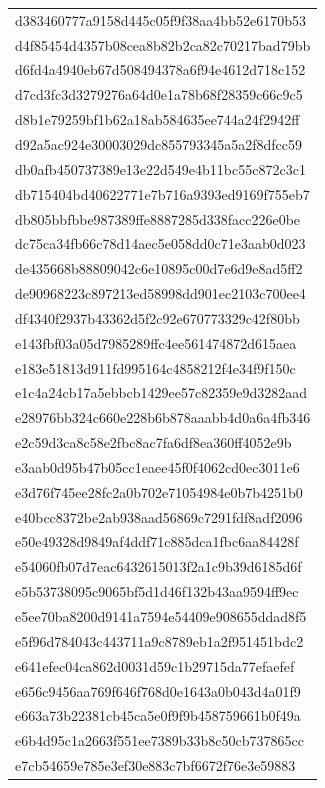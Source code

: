 \begin{tabular}{l}
d383460777a9158d445c05f9f38aa4bb52e6170b53 \\
d4f85454d4357b08cea8b82b2ca82c70217bad79bb \\
d6fd4a4940eb67d508494378a6f94e4612d718c152 \\
d7cd3fc3d3279276a64d0e1a78b68f28359c66c9c5 \\
d8b1e79259bf1b62a18ab584635ee744a24f2942ff \\
d92a5ac924e30003029dc855793345a5a2f8dfcc59 \\
db0afb450737389e13e22d549e4b11bc55c872c3c1 \\
db715404bd40622771e7b716a9393ed9169f755eb7 \\
db805bbfbbe987389ffe8887285d338facc226e0be \\
dc75ca34fb66c78d14aec5e058dd0c71e3aab0d023 \\
de435668b88809042c6e10895c00d7e6d9e8ad5ff2 \\
de90968223c897213ed58998dd901ec2103c700ee4 \\
df4340f2937b43362d5f2c92e670773329c42f80bb \\
e143fbf03a05d7985289ffc4ee561474872d615aea \\
e183e51813d911fd995164c4858212f4e34f9f150c \\
e1c4a24cb17a5ebbcb1429ee57c82359e9d3282aad \\
e28976bb324c660e228b6b878aaabb4d0a6a4fb346 \\
e2c59d3ca8c58e2fbc8ac7fa6df8ea360ff4052e9b \\
e3aab0d95b47b05cc1eaee45f0f4062cd0ec3011e6 \\
e3d76f745ee28fc2a0b702e71054984e0b7b4251b0 \\
e40bcc8372be2ab938aad56869c7291fdf8adf2096 \\
e50e49328d9849af4ddf71c885dca1fbc6aa84428f \\
e54060fb07d7eac6432615013f2a1c9b39d6185d6f \\
e5b53738095c9065bf5d1d46f132b43aa9594ff9ec \\
e5ee70ba8200d9141a7594e54409e908655ddad8f5 \\
e5f96d784043c443711a9c8789eb1a2f951451bdc2 \\
e641efec04ca862d0031d59c1b29715da77efaefef \\
e656c9456aa769f646f768d0e1643a0b043d4a01f9 \\
e663a73b22381cb45ca5e0f9f9b458759661b0f49a \\
e6b4d95c1a2663f551ee7389b33b8c50cb737865cc \\
e7cb54659e785e3ef30e883c7bf6672f76e3e59883 \\

\end{tabular}
